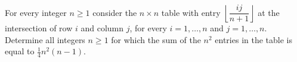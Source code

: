 For every integer $n \geq 1$ consider the $n \times n$ table with entry $\left\lfloor \dfrac{ij}{n+1} \right\rfloor$ at the intersection of row $i$ and column $j$, for every $i=1,\ldots,n$ and $j=1,\ldots,n$. Determine all integers $n \geq 1$ for which the sum of the $n^2$ entries in the table is equal to $\frac{1}{4}n^2(n-1)$.
